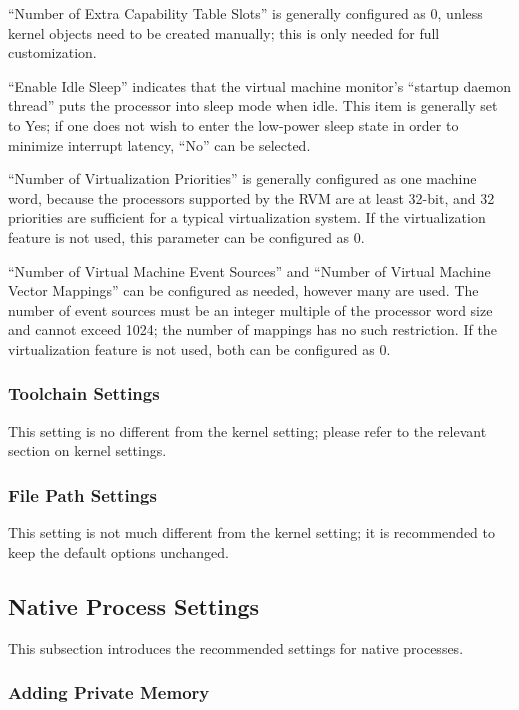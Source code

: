 ``Number of Extra Capability Table Slots'' is generally configured as 0, unless kernel objects need to be created manually; this is only needed for full customization.

``Enable Idle Sleep'' indicates that the virtual machine monitor's ``startup daemon thread'' puts the processor into sleep mode when idle. This item is generally set to Yes; if one does not wish to enter the low-power sleep state in order to minimize interrupt latency, ``No'' can be selected.

``Number of Virtualization Priorities'' is generally configured as one machine word, because the processors supported by the RVM are at least 32-bit, and 32 priorities are sufficient for a typical virtualization system. If the virtualization feature is not used, this parameter can be configured as 0.

``Number of Virtual Machine Event Sources'' and ``Number of Virtual Machine Vector Mappings'' can be configured as needed, however many are used. The number of event sources must be an integer multiple of the processor word size and cannot exceed 1024; the number of mappings has no such restriction. If the virtualization feature is not used, both can be configured as 0.

\subsubsection{Toolchain Settings}\label{subsubsec:6-5-3-3}

This setting is no different from the kernel setting; please refer to the relevant section on kernel settings.

\subsubsection{File Path Settings}\label{subsubsec:6-5-3-4}

This setting is not much different from the kernel setting; it is recommended to keep the default options unchanged.

\subsection{Native Process Settings}\label{subsec:6-5-4}

This subsection introduces the recommended settings for native processes.

\subsubsection{Adding Private Memory}\label{subsubsec:6-5-4-1}

